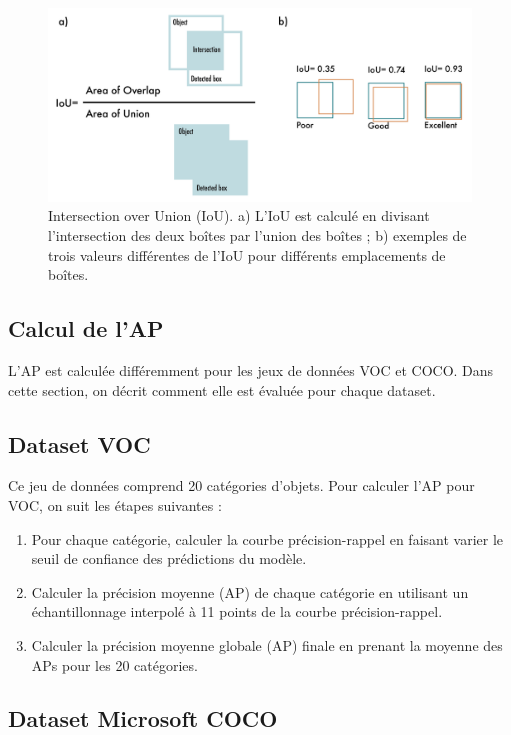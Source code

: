 \documentclass{article}
\begin{document}
\begin{figure}[htbp]
    \centering
    \includegraphics[scale=0.2]{Figures/IoU.png}
    \caption{Intersection over Union (IoU). a) L'IoU est calculé en divisant l'intersection des deux boîtes par l'union des boîtes ; b) exemples de trois valeurs différentes de l'IoU pour différents emplacements de boîtes.}
    \label{fig:IoU}
\end{figure}

\subsection{Calcul de l'AP}
L'AP est calculée différemment pour les jeux de données VOC et COCO. Dans cette section, on décrit comment elle est évaluée pour chaque dataset.

\subsection*{Dataset VOC}

Ce jeu de données comprend 20 catégories d'objets. Pour calculer l'AP pour VOC, on suit les étapes suivantes :
\begin{enumerate}
    \item Pour chaque catégorie, calculer la courbe précision-rappel en faisant varier le seuil de confiance des prédictions du modèle.
    \item Calculer la précision moyenne (AP) de chaque catégorie en utilisant un échantillonnage interpolé à 11 points de la courbe précision-rappel.
    \item Calculer la précision moyenne globale (AP) finale en prenant la moyenne des APs pour les 20 catégories.
\end{enumerate}

\subsection*{Dataset Microsoft COCO}
\end{document}
